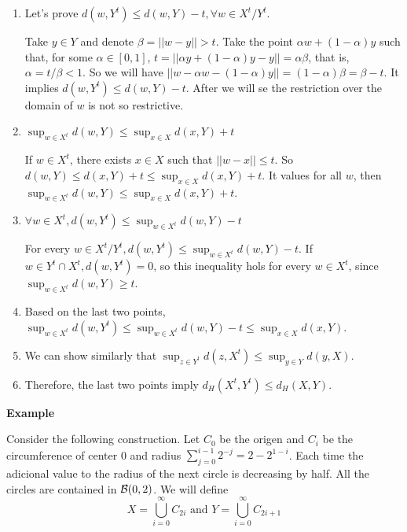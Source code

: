 \begin{enumerate}
    \item Let's prove $d(w,Y^t) \le d(w,Y) - t, \forall w \in X^t/Y^t$. 
    
    Take $y \in Y$ and denote $\beta = ||w - y|| > t$. Take the point $\alpha
    w + (1 - \alpha)y$ such that, for some $\alpha \in [0,1]$, $t = ||\alpha y
    + (1-\alpha)y - y|| = \alpha\beta$, that is, $\alpha = t/\beta < 1$. So we
    will have $||w - \alpha w - (1 - \alpha)y|| = (1 - \alpha)\beta = \beta -
    t$. It implies $d(w,Y^t) \le d(w,Y) - t$. After we will se the restriction
    over the domain of $w$ is not so restrictive. 

    \item  $\sup_{w \in X^t} d(w, Y) \le \sup_{x \in X} d(x,Y) + t$ 
    
    If $w \in X^t$, there exists $x \in X$ such that $||w - x|| \le t$.
    So $d(w, Y) \le d(x,Y) + t \le \sup_{x \in X} d(x,Y) + t$. It values for
    all $w$, then $\sup_{w \in X^t} d(w, Y) \le \sup_{x \in X} d(x,Y) + t$.

    \item $\forall w \in X^t, d(w, Y^t) \le \sup_{w \in X^t} d(w, Y) - t$
    
    For every $w \in X^t/Y^t, d(w, Y^t) \le \sup_{w \in X^t} d(w, Y) -
    t$. If $w \in Y^t \cap X^t, d(w,Y^t) = 0$, so this inequality hols for
    every $w \in X^t$, since $\sup_{w \in X^t} d(w, Y) \ge t$.
    
    \item Based on the last two points, $\sup_{w \in X^t} d(w, Y^t) \le \sup_{w \in
    X^t} d(w, Y) - t \le \sup_{x \in X} d(x, Y)$. 

    \item We can show similarly that $\sup_{z \in Y^t} d(z, X^t) \le \sup_{y
    \in Y} d(y, X)$. 

    \item Therefore, the last two points imply $d_H(X^t, Y^t) \le d_H(X,Y)$. 

\end{enumerate}

\textbf{Example}

Consider the following construction. Let $C_0$ be the origen and $C_i$ be the
circumference of center 0 and radius $\sum_{j=0}^{i-1} 2^{-j} = 2 - 2^{1-i}$.
Each time the adicional value to the radius of the next circle is decreasing
by half. All the circles are contained in $\mathcal{B}(0,2)$. We will define $$X =
\bigcup_{i=0}^{\infty} C_{2i} \text{ and } Y =
\bigcup_{i=0}^{\infty} C_{2i + 1}$$

